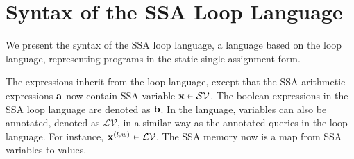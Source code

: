 \section{Syntax of the SSA Loop Language }
\label{sec:adapt-syntax-ssa-loop}
We present the syntax of the SSA loop language, a language based on the {loop} language, representing programs in the static single assignment form.

The expressions inherit from the {loop} language, except that the SSA arithmetic expressions ${\bf{{a}}}$ now contain SSA variable ${\bf{{x}}} \in \mathcal{SV}$. The boolean expressions in the SSA loop language are denoted as ${\bf{{b}}}$. In the language, variables can also be annotated, denoted as $\mathcal{LV}$, in a similar way as the annotated queries in the {loop} language. For instance, ${\bf{{x}}}^{(l,w)} \in  \mathcal{LV}$. The SSA memory now is a map from SSA variables to values.
%

